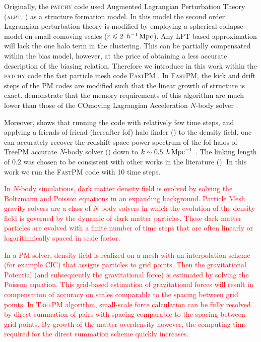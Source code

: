 \documentclass[english,usenatbib]{mn2e}
\newcommand{\tod}[1]{{\textcolor{red}{ #1}}}
\newcommand{\mperh}{\,h^{-1}\,{\rm Mpc}}
\newcommand{\hperm}{\,h\,{\rm Mpc}^{-1}}
\begin{document}
Originally, the \textsc{patchy} code used Augmented Lagrangian Perturbation Theory (\textsc{alpt}, \citealt{alpt}) as a structure formation model. In this model the second order Lagrangian perturbation theory is modified by employing a spherical collapse model on small comoving scales ($r\leq 2\;\mperh$). 
Any LPT based approximation will lack the one halo term in the clustering. This can be partially compensated within the bias model, however, at the price of obtaining a less accurate description of the biasing relation.
Therefore we introduce in this work within the \textsc{patchy} code the fast particle mesh code \textsc{FastPM} \citep{fastpm}. 
In \textsc{FastPM}, the kick and drift steps of the PM codes are modified such that the linear growth of structure is exact. \citet{fastpm} demonstrate that the memory requirements of this algorithm are much lower than those of the COmoving Lagrangian Acceleration $N$-body solver \citep[\textsc{cola},][]{cola2013}. 

Moreover, \citet{fastpm} shows that running the code with relatively few time steps, and applying a friends-of-friend (hereafter fof) halo finder (\citealt{fof}) to the density field, one can accurately recover the redshift space power spectrum of the fof halos of TreePM accurate $N$-body solver (\citealt{treepm}) down to $k \sim 0.5 \; \hperm$ . The linking length of 0.2 was chosen to be consistent with other works in the literature (\citealt{cola2013}). In this work we run the \textsc{FastPM} code with 10 time steps. 

\tod{In $N$-body simulations, dark matter density field is evolved by solving the Boltzmann and Poisson equations in an expanding background. Particle Mesh gravity solvers are a class of $N$-body solvers in which the evolution of the density field is governed by the dynamic of dark matter particles. These dark matter particles are evolved with a finite number of time steps that are often linearly or logarithmically spaced in scale factor.}

\tod{In a \textsc{PM} solver, density field is realized on a mesh with an interpolation scheme (for example CIC) that assigns particles to grid points. 
Then the gravitational Potential (and subsequently the gravitational force) is estimated by solving the Poisson equation. This grid-based estimation of gravitational forces will result in compensation of accuracy on scales comparable to the spacing between grid points. In \textsc{TreePM} algorithm, small-scale force calculation can be fully resolved by direct summation of pairs with spacing comparable to the spacing between grid points. By growth of the matter overdensity however, the computing time required for the direct summation scheme quickly increases.} 
\end{document}
